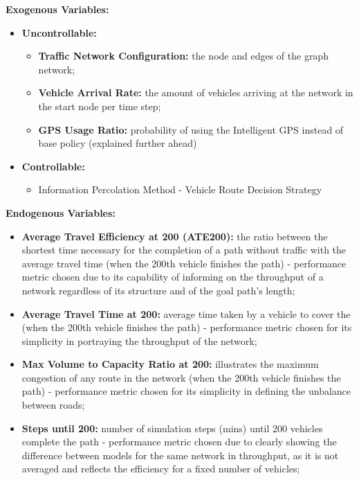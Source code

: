 \textbf{Exogenous Variables:}
\begin{itemize}
    \item \textbf{Uncontrollable:}
    \begin{itemize}
        \item \textbf{Traffic Network Configuration:} the node and edges of the graph network;
        \item \textbf{Vehicle Arrival Rate:} the amount of vehicles arriving at the network in the start node per time step;
        \item \textbf{GPS Usage Ratio:} probability of using the Intelligent GPS instead of base policy (explained further ahead)
    \end{itemize}
    \item \textbf{Controllable:}
    \begin{itemize}
        \item Information Percolation Method - Vehicle Route Decision Strategy 
    \end{itemize}
\end{itemize}

\textbf{Endogenous Variables:}
\begin{itemize}
    \item \textbf{Average Travel Efficiency at 200 (ATE200):} the ratio between the shortest time necessary for the completion of a path without traffic with the average travel time (when the 200th vehicle finishes the path) - performance metric chosen due to its capability of informing on the throughput of a network regardless of its structure and of the goal path's length;
    \item \textbf{Average Travel Time at 200:} average time taken by a vehicle to cover the (when the 200th vehicle finishes the path) - performance metric chosen for its simplicity in portraying the throughput of the network;
    \item \textbf{Max Volume to Capacity Ratio at 200:} illustrates the maximum congestion of any route in the network (when the 200th vehicle finishes the path) - performance metric chosen for its simplicity in defining the unbalance between roads;
    \item \textbf{Steps until 200:} number of simulation steps (mins) until 200 vehicles complete the path - performance metric chosen due to clearly showing the difference between models for the same network in throughput, as it is not averaged and reflects the efficiency for a fixed number of vehicles; 
\end{itemize}

